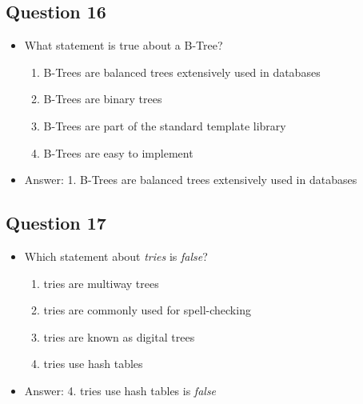 \begin{slide}
\section[-1]{Question 16}

\begin{PauseHighLight}
  \begin{itemize}
  \item What statement is true about a B-Tree?
    \begin{enumerate}
    \item B-Trees are balanced trees extensively used in databases
    \item B-Trees are binary trees
    \item B-Trees are part of the standard template library
    \item B-Trees are easy to implement\pause
    \end{enumerate}
  \item Answer: 1. B-Trees are balanced trees extensively used in databases\pauseb
  \end{itemize}
\end{PauseHighLight}
\end{slide}

\begin{slide}
\section[-1]{Question 17}

\begin{PauseHighLight}
  \begin{itemize}
  \item Which statement about \emph{tries} is \emph{false}?
    \begin{enumerate}
    \item tries are multiway trees
    \item tries are commonly used for spell-checking
    \item tries are known as digital trees
    \item tries use hash tables\pause
    \end{enumerate}
  \item Answer: 4. tries use hash tables is \emph{false}\pauseb
  \end{itemize}
\end{PauseHighLight}
\end{slide}

